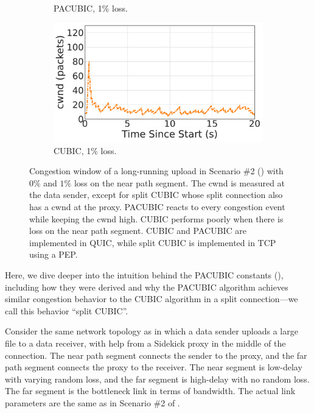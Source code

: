 \begin{figure}[ht]
\begin{subfigure}{0.32\linewidth}
  \caption{PACUBIC, 1\% loss.}
  \label{fig:time-cwnd:pacubic-loss1p}
\end{subfigure}
\begin{subfigure}{0.32\linewidth}
  \includegraphics[width=\linewidth]{sidekick/figures/cwnd_cubic_loss1p.pdf}
  \caption{CUBIC, 1\% loss.}
  \label{fig:time-cwnd:cubic-loss1p}
\end{subfigure}
\caption{Congestion window of a long-running upload in Scenario \#2
() with $0\%$ and $1\%$ loss on the
near path segment. The cwnd is measured at the data sender,
except for split CUBIC whose split connection also has a cwnd at the proxy.
PACUBIC reacts to every congestion event while keeping the cwnd high.
CUBIC performs poorly when there is loss on the near path segment.
CUBIC and PACUBIC are implemented in QUIC, while split CUBIC is implemented
in TCP using a PEP.
}
\label{fig:time-cwnd}
\end{figure}

Here, we dive deeper into the intuition behind the PACUBIC constants
(), including how they were derived and why
the PACUBIC algorithm achieves similar congestion behavior to the CUBIC
algorithm in a split connection---we call this behavior ``split CUBIC''.

Consider the same network topology as  in which a
data sender uploads a large file to a data receiver, with help from a Sidekick
proxy in the middle of the connection. The near path segment connects the sender
to the proxy, and the far path segment connects the proxy to the receiver.
The near segment is low-delay with varying random loss, and the far segment is
high-delay with no random loss. The far segment is the bottleneck link in terms
of bandwidth.
The actual link parameters are the same as in Scenario \#2 of
.

